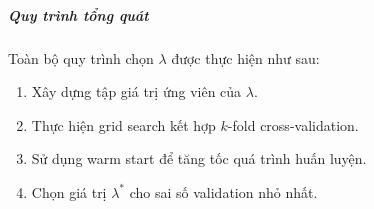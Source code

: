\subparagraph{Quy trình tổng quát}
Toàn bộ quy trình chọn $\lambda$ được thực hiện như sau:
\begin{enumerate}
    \item Xây dựng tập giá trị ứng viên của $\lambda$.
    \item Thực hiện grid search kết hợp $k$-fold cross-validation.
    \item Sử dụng warm start để tăng tốc quá trình huấn luyện.
    \item Chọn giá trị $\lambda^\ast$ cho sai số validation nhỏ nhất.
\end{enumerate}
